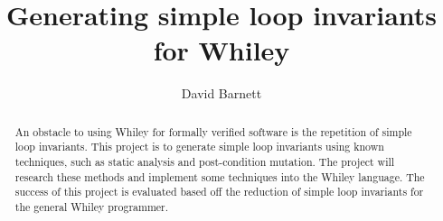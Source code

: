 \documentclass[11pt, a4paper, twoside, openright]{report}
\title{Generating simple loop invariants for Whiley}
\author{David Barnett}
\date{}
\begin{document}
\frontmatter


\begin{abstract}
    An obstacle to using Whiley for formally verified software is the 
    repetition of simple loop invariants.
    This project is to generate simple loop invariants using
    known techniques, such as static analysis and post-condition mutation.
    The project will research these methods and implement some techniques
    into the Whiley language.
    The success of this project is evaluated based off the reduction
    of simple loop invariants for the general Whiley programmer.
\end{abstract}


\maketitle




\mainmatter


%
\end{document}
